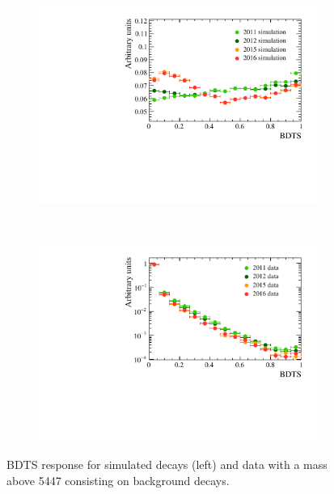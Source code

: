 \begin{figure}[htbp]
    \centering
    \begin{subfigure}[b]{0.45\textwidth}
        \includegraphics[width=\textwidth]{./Figs/Selection/BDTS_signal_Feb6.pdf}
    \end{subfigure}
    ~ %
    \begin{subfigure}[b]{0.45\textwidth}
       \includegraphics[width=\textwidth]{./Figs/Selection/BDTS_background_Feb6.pdf}
    \end{subfigure}
    \caption{BDTS response for simulated \bsmumu decays (left) and data with a mass above 5447 \mevcc consisting on background decays.}
    \label{fig:FlatteningBDTS}
\end{figure}

